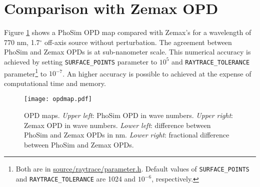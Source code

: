 \documentclass[12pt,twoside]{article}
\begin{document}
\section{Comparison with Zemax OPD}
Figure \ref{fig:opdmap} shows a PhoSim OPD map compared with Zemax's for a wavelength of 770 nm, 1.7$^{\circ}$ off-axis source without perturbation. The agreement between PhoSim and Zemax OPDs is at sub-nanometer scale. This numerical accuracy is achieved by setting \texttt{SURFACE\_POINTS} parameter to $10^5$ and \texttt{RAYTRACE\_TOLERANCE} parameter\footnote{Both are in \url{source/raytrace/parameter.h}. Default values of \texttt{SURFACE\_POINTS} and \texttt{RAYTRACE\_TOLERANCE} are 1024 and $10^{-6}$, respectively.} to $10^{-7}$. An higher accuracy is possible to achieved at the expense of computational time and memory.

\begin{figure}[h!tb]
\begin{center}
\texttt{[image: opdmap.pdf]}
\end{center}
\caption{OPD maps. {\it Upper left}: PhoSim OPD in wave numbers. {\it Upper right}: Zemax OPD in wave numbers. {\it Lower left}: difference between PhoSim and Zemax OPDs in nm. {\it Lower right}: fractional difference between PhoSim and Zemax OPDs.}
\label{fig:opdmap}
\end{figure}









\clearpage


\end{document}
